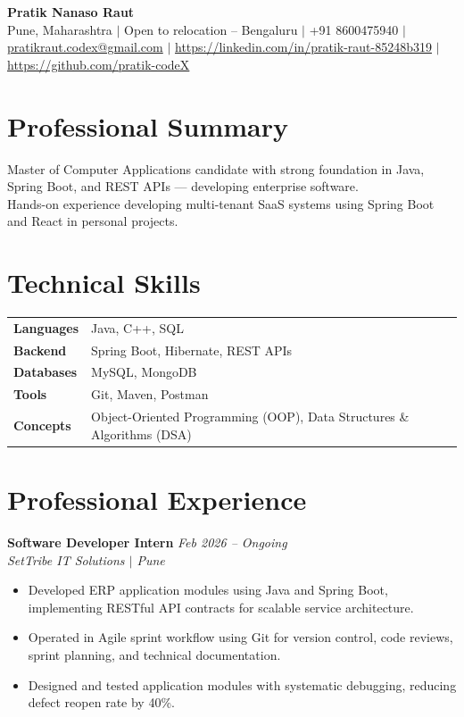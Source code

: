 \documentclass[10.5pt,a4paper]{article}
\begin{document}
\begin{center}
{\Large\bfseries Pratik Nanaso Raut}\\[2pt]
Pune, Maharashtra $|$ Open to relocation -- Bengaluru $|$ +91 8600475940 $|$ \href{mailto:pratikraut.codex@gmail.com}{pratikraut.codex@gmail.com} $|$ \href{https://linkedin.com/in/pratik-raut-85248b319}{https://linkedin.com/in/pratik-raut-85248b319} $|$ \href{https://github.com/pratik-codeX}{https://github.com/pratik-codeX}
\end{center}
\vspace{-2pt}
\section{Professional Summary}
Master of Computer Applications candidate with strong foundation in Java, Spring Boot, and REST APIs — developing enterprise software.\\[2pt]
Hands-on experience developing multi-tenant SaaS systems using Spring Boot and React in personal projects.
\section{Technical Skills}
\begin{tabular}{@{}p{}p{}@{}}
\textbf{Languages} & Java, C++, SQL \\[1pt]
\textbf{Backend} & Spring Boot, Hibernate, REST APIs \\[1pt]
\textbf{Databases} & MySQL, MongoDB \\[1pt]
\textbf{Tools} & Git, Maven, Postman \\[1pt]
\textbf{Concepts} & Object-Oriented Programming (OOP), Data Structures \& Algorithms (DSA) \\
\end{tabular}
\section{Professional Experience}
\textbf{Software Developer Intern} \hfill \textit{Feb 2026 -- Ongoing}
\\\textit{SetTribe IT Solutions $|$ Pune}
\begin{itemize}
  \item Developed ERP application modules using Java and Spring Boot, implementing RESTful API contracts for scalable service architecture.
  \item Operated in Agile sprint workflow using Git for version control, code reviews, sprint planning, and technical documentation.
  \item Designed and tested application modules with systematic debugging, reducing defect reopen rate by 40\%.
\end{itemize}
\end{document}

